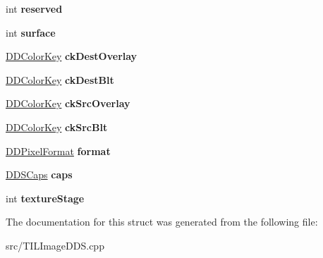 \begin{DoxyCompactItemize}
\item 
\hypertarget{structtil_1_1_d_d_surface_desc_a7f716bf8b136ce901c53660dffbd9597}{
int {\bfseries reserved}}
\label{structtil_1_1_d_d_surface_desc_a7f716bf8b136ce901c53660dffbd9597}

\item 
\hypertarget{structtil_1_1_d_d_surface_desc_a05e559fe8ea107a5d4e702fa246222db}{
int {\bfseries surface}}
\label{structtil_1_1_d_d_surface_desc_a05e559fe8ea107a5d4e702fa246222db}

\item 
\hypertarget{structtil_1_1_d_d_surface_desc_a44ad6e833f2a4b3352ace81d3495c748}{
\hyperlink{structtil_1_1_d_d_color_key}{DDColorKey} {\bfseries ckDestOverlay}}
\label{structtil_1_1_d_d_surface_desc_a44ad6e833f2a4b3352ace81d3495c748}

\item 
\hypertarget{structtil_1_1_d_d_surface_desc_a74429575a9d7f540ceb9c042bace39a8}{
\hyperlink{structtil_1_1_d_d_color_key}{DDColorKey} {\bfseries ckDestBlt}}
\label{structtil_1_1_d_d_surface_desc_a74429575a9d7f540ceb9c042bace39a8}

\item 
\hypertarget{structtil_1_1_d_d_surface_desc_ae27f18dc1201aef4d22df501d86e5c2e}{
\hyperlink{structtil_1_1_d_d_color_key}{DDColorKey} {\bfseries ckSrcOverlay}}
\label{structtil_1_1_d_d_surface_desc_ae27f18dc1201aef4d22df501d86e5c2e}

\item 
\hypertarget{structtil_1_1_d_d_surface_desc_a440d2da46b75f9d006444a9c114b1a13}{
\hyperlink{structtil_1_1_d_d_color_key}{DDColorKey} {\bfseries ckSrcBlt}}
\label{structtil_1_1_d_d_surface_desc_a440d2da46b75f9d006444a9c114b1a13}

\item 
\hypertarget{structtil_1_1_d_d_surface_desc_a2942b2dcb63759e4306aff5456c6e90a}{
\hyperlink{structtil_1_1_d_d_pixel_format}{DDPixelFormat} {\bfseries format}}
\label{structtil_1_1_d_d_surface_desc_a2942b2dcb63759e4306aff5456c6e90a}

\item 
\hypertarget{structtil_1_1_d_d_surface_desc_a29fba3e60bbd16188a52b9665aa967bf}{
\hyperlink{structtil_1_1_d_d_s_caps}{DDSCaps} {\bfseries caps}}
\label{structtil_1_1_d_d_surface_desc_a29fba3e60bbd16188a52b9665aa967bf}

\item 
\hypertarget{structtil_1_1_d_d_surface_desc_a05cc037caa38a484d77067060d9f2a30}{
int {\bfseries textureStage}}
\label{structtil_1_1_d_d_surface_desc_a05cc037caa38a484d77067060d9f2a30}

\end{DoxyCompactItemize}


The documentation for this struct was generated from the following file:\begin{DoxyCompactItemize}
\item 
src/TILImageDDS.cpp\end{DoxyCompactItemize}

